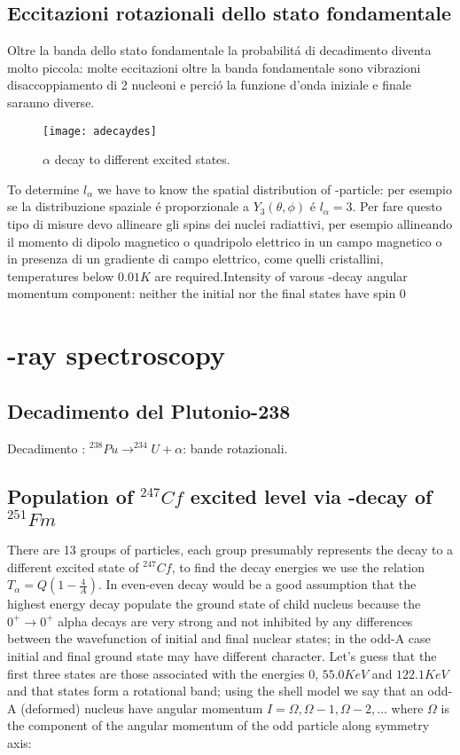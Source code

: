 \subsection{Eccitazioni rotazionali dello stato fondamentale}
Oltre la banda dello stato fondamentale la probabilit\'a di decadimento diventa molto piccola: molte eccitazioni oltre la banda  fondamentale sono vibrazioni disaccoppiamento di 2 nucleoni e perci\'o la funzione d'onda iniziale e finale saranno diverse. 

 \begin{figure}[!ht]
\centering
\texttt{[image: adecaydes]}
\caption{$\alpha$ decay to different excited states.}
\end{figure}

To determine $l_{\alpha}$ we have to know the spatial distribution of \Ra-particle: per esempio se la distribuzione spaziale \'e proporzionale a $Y_3(\theta,\phi)$ \'e $l_{\alpha}=3$. Per fare questo tipo di misure devo allineare gli spins dei nuclei radiattivi, per esempio allineando il momento di dipolo magnetico o quadripolo elettrico in un campo magnetico o in presenza di un gradiente di campo elettrico, come quelli cristallini, temperatures below $0.01K$ are required.Intensity of varous \Ra-decay angular momentum component: neither the initial nor the final states have spin 0

\section{\Ra-ray spectroscopy}

\subsection{Decadimento del Plutonio-238}
Decadimento \Ra: $^{238}Pu\rightarrow^{234}U+\alpha$: bande rotazionali.

\subsection{Population of $^{247}Cf$ excited level via \Ra-decay of $^{251}Fm$}

There are 13 groups of \Ra particles, each group presumably represents the decay to a different excited state of $^{247}Cf$, to find the decay energies we use the relation $T_{\alpha}=Q(1-\frac{4}{A})$. In even-even decay would be a good assumption that the highest energy \Ra decay populate the ground state of child nucleus because the $0^+\rightarrow0^+$ alpha decays are very strong and not inhibited by any differences between the wavefunction of initial and final nuclear states; in the odd-A case initial and final ground state may have different character. Let's guess that the first three states are those associated with the energies $0$, $55.0 KeV$ and $122.1 KeV$ and that states form a rotational band; using the shell model we say that an odd-A (deformed) nucleus have angular momentum $I=\Omega,\Omega-1,\Omega-2,\ldots$ where $\Omega$ is the component of the angular momentum of the odd particle along symmetry axis: 

